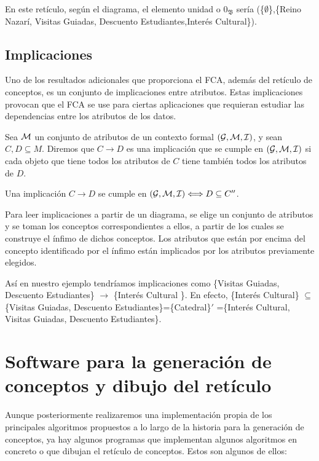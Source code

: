 \documentclass[oneside,openright,titlepage,numbers=noenddot,openany,headinclude,footinclude=true,
cleardoublepage=empty,abstractoff,BCOR=5mm,paper=a4,fontsize=12pt,main=spanish]{scrreprt}
\begin{document}
En este retículo, según el diagrama, el elemento unidad o $0_{\mathfrak{B}}$ sería (\{$\emptyset$\},\{Reino Nazarí, Visitas Guiadas, Descuento Estudiantes,Interés Cultural\}).

\subsection{Implicaciones}

Uno de los resultados adicionales que proporciona el FCA, además del retículo de conceptos, es un conjunto de implicaciones entre atributos. Estas implicaciones provocan que el FCA se use para ciertas aplicaciones que requieran estudiar las dependencias entre los atributos de los datos. 

\begin{definition}
Sea $\mathcal{M}$ un conjunto de atributos de un contexto formal $(\mathcal{G},\mathcal{M},\mathcal{I})$, y sean $C,D \subseteq M$. Diremos que $C \to D$ es una implicación que se cumple en $(\mathcal{G},\mathcal{M},\mathcal{I})$ si cada objeto que tiene todos los atributos de $C$ tiene también todos los atributos de $D.$
\end{definition}

\begin{proposition}\cite{ganter_formal_1999}
Una implicación $C \to D$ se cumple en $(\mathcal{G},\mathcal{M},\mathcal{I}) \Longleftrightarrow D \subseteq C''$.
\end{proposition}

 Para leer implicaciones a partir de un diagrama, se elige un conjunto de atributos y se toman los conceptos correspondientes a ellos, a partir de los cuales se construye el ínfimo de dichos conceptos. Los  atributos  que  están  por encima  del  concepto  identificado por el ínfimo están implicados por los atributos previamente elegidos. 

Así en nuestro ejemplo tendríamos implicaciones como \{Visitas Guiadas, Descuento Estudiantes\} $\to$ \{Interés Cultural \}. En efecto, \{Interés Cultural\} $\subseteq $ \{Visitas Guiadas, Descuento Estudiantes\}=\{Catedral\}$'$ =\{Interés Cultural, Visitas Guiadas, Descuento Estudiantes\}.


\section{Software para la generación de conceptos y dibujo del retículo}

Aunque posteriormente realizaremos una implementación propia de los principales algoritmos propuestos a lo largo de la historia para la generación de conceptos, ya hay algunos programas que implementan algunos algoritmos en concreto o que dibujan el retículo de conceptos. Estos son algunos de ellos:
\end{document}
